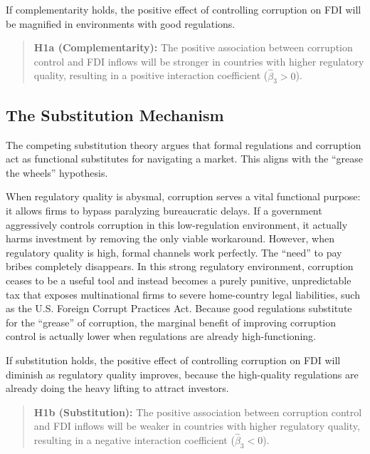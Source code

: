 \documentclass[
  12pt,
  letterpaper,
  DIV=11,
  numbers=noendperiod]{scrartcl}
\begin{document}
If complementarity holds, the positive effect of controlling corruption
on FDI will be magnified in environments with good regulations.

\begin{quote}
\textbf{H1a (Complementarity):} The positive association between
corruption control and FDI inflows will be stronger in countries with
higher regulatory quality, resulting in a positive interaction
coefficient (\(\hat{\beta}_3 > 0\)).
\end{quote}

\subsection{The Substitution
Mechanism}\label{the-substitution-mechanism}

The competing substitution theory argues that formal regulations and
corruption act as functional substitutes for navigating a market. This
aligns with the ``grease the wheels'' hypothesis.

When regulatory quality is abysmal, corruption serves a vital functional
purpose: it allows firms to bypass paralyzing bureaucratic delays. If a
government aggressively controls corruption in this low-regulation
environment, it actually harms investment by removing the only viable
workaround. However, when regulatory quality is high, formal channels
work perfectly. The ``need'' to pay bribes completely disappears. In
this strong regulatory environment, corruption ceases to be a useful
tool and instead becomes a purely punitive, unpredictable tax that
exposes multinational firms to severe home-country legal liabilities,
such as the U.S. Foreign Corrupt Practices Act. Because good regulations
substitute for the ``grease'' of corruption, the marginal benefit of
improving corruption control is actually lower when regulations are
already high-functioning.

If substitution holds, the positive effect of controlling corruption on
FDI will diminish as regulatory quality improves, because the
high-quality regulations are already doing the heavy lifting to attract
investors.

\begin{quote}
\textbf{H1b (Substitution):} The positive association between corruption
control and FDI inflows will be weaker in countries with higher
regulatory quality, resulting in a negative interaction coefficient
(\(\hat{\beta}_3 < 0\)).
\end{quote}
\end{document}
